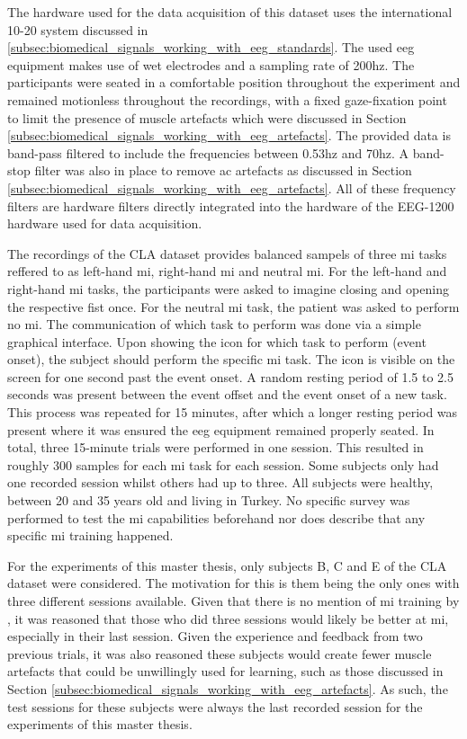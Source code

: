 The hardware used for the data acquisition of this dataset uses the international 10-20 system discussed in \ref{subsec:biomedical_signals_working_with_eeg_standards}.
The used \gls{eeg} equipment makes use of wet electrodes and a sampling rate of 200\gls{hz}.
The participants were seated in a comfortable position throughout the experiment and remained motionless throughout the recordings, with a fixed gaze-fixation point to limit the presence of muscle artefacts which were discussed in Section \ref{subsec:biomedical_signals_working_with_eeg_artefacts}.
The provided data is band-pass filtered to include the frequencies between 0.53\gls{hz} and 70\gls{hz}.
A band-stop filter was also in place to remove \gls{ac} artefacts as discussed in Section \ref{subsec:biomedical_signals_working_with_eeg_artefacts}.
All of these frequency filters are hardware filters directly integrated into the hardware of the EEG-1200 hardware used for data acquisition.

The recordings of the CLA dataset provides balanced sampels of three \gls{mi} tasks reffered to as left-hand \gls{mi}, right-hand \gls{mi} and neutral \gls{mi}.
For the left-hand and right-hand \gls{mi} tasks, the participants were asked to imagine closing and opening the respective fist once.
For the neutral \gls{mi} task, the patient was asked to perform no \gls{mi}.
The communication of which task to perform was done via a simple graphical interface.
Upon showing the icon for which task to perform (event onset), the subject should perform the specific \gls{mi} task.
The icon is visible on the screen for one second past the event onset.
A random resting period of 1.5 to 2.5 seconds was present between the event offset and the event onset of a new task.
This process was repeated for 15 minutes, after which a longer resting period was present where it was ensured the \gls{eeg} equipment remained properly seated.
In total, three 15-minute trials were performed in one session.
This resulted in roughly 300 samples for each \gls{mi} task for each session.
Some subjects only had one recorded session whilst others had up to three.
All subjects were healthy, between 20 and 35 years old and living in Turkey.
No specific survey was performed to test the \gls{mi} capabilities beforehand nor does \citet{eeg_data} describe that any specific \gls{mi} training happened.

For the experiments of this master thesis, only subjects B, C and E of the CLA dataset were considered.
The motivation for this is them being the only ones with three different sessions available.
Given that there is no mention of \gls{mi} training by \citet{eeg_data}, it was reasoned that those who did three sessions would likely be better at \gls{mi}, especially in their last session.
Given the experience and feedback from two previous trials, it was also reasoned these subjects would create fewer muscle artefacts that could be unwillingly used for learning, such as those discussed in Section \ref{subsec:biomedical_signals_working_with_eeg_artefacts}.
As such, the test sessions for these subjects were always the last recorded session for the experiments of this master thesis.

